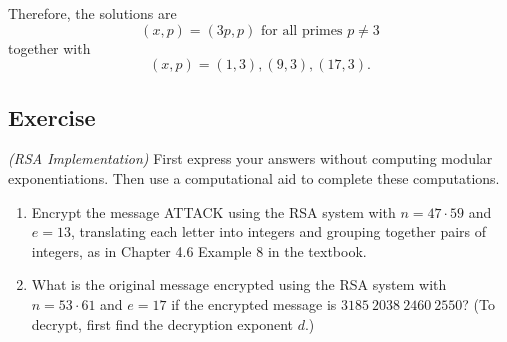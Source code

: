 \documentclass{article}
\newcounter{counter}
\newcommand{\Exercise}{Exercise \stepcounter{counter}\thecounter}
\begin{document}
    Therefore, the solutions are
    $$\boxed{(x,p) = (3p,p) \text{ for all primes } p \neq 3}$$
    together with
    $$\boxed{(x,p) = (1,3), (9,3), (17,3)}.$$

\subsection*{\Exercise}
    \textit{(RSA Implementation)} First express your answers without computing modular exponentiations. Then use a computational aid to complete these computations.
    \begin{enumerate}
        \item Encrypt the message ATTACK using the RSA system with $n = 47 \cdot 59$ and $e = 13$, translating each letter into integers and grouping together pairs of integers, as in Chapter 4.6 Example 8 in the textbook.
        \item What is the original message encrypted using the RSA system with $n = 53 \cdot 61$ and $e=17$ if the encrypted message is $3185\ 2038\ 2460\ 2550$? (To decrypt, first find the decryption exponent $d$.)
    \end{enumerate}
\end{document}
